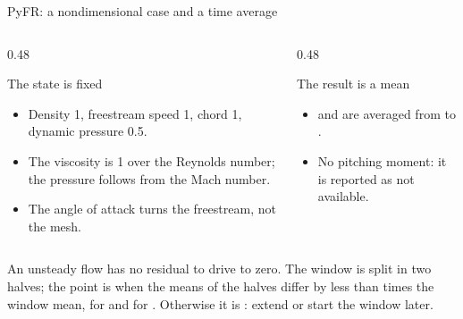 \begin{frame}{PyFR: a nondimensional case and a time average}
\begin{columns}[T]
\begin{column}{0.48\textwidth}
\begin{block}{The state is fixed}
\begin{itemize}\small
  \item Density 1, freestream speed 1, chord 1, dynamic pressure 0.5.
  \item The viscosity is 1 over the Reynolds number; the pressure follows
        from the Mach number.
  \item The angle of attack turns the freestream, not the mesh.
\end{itemize}
\end{block}
\end{column}
\begin{column}{0.48\textwidth}
\begin{block}{The result is a mean}
\begin{itemize}\small
  \item {} and  are averaged from  to
        .
  \item No pitching moment: it is reported as not available.
\end{itemize}
\end{block}
\end{column}
\end{columns}
\begin{cfdbevidence}
An unsteady flow has no residual to drive to zero. The window is split in two
halves; the point is  when the means of the halves differ by
less than  times the window mean, for  and for
. Otherwise it is : extend  or
start the window later.
\end{cfdbevidence}
\end{frame}
